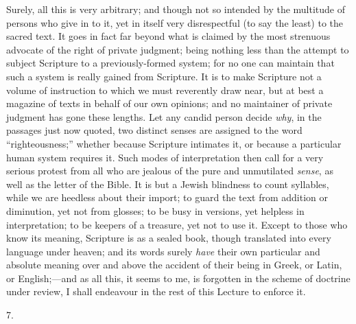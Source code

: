 Surely, all this is very arbitrary; and though not so intended by
the multitude of persons who give in to it, yet in itself very
disrespectful (to say the least) to the sacred text. It goes in fact
far beyond what is claimed by the most strenuous advocate of the right
of private judgment; being nothing less than the attempt to subject
Scripture to a previously-formed system; for no one can maintain that
such a system is really gained from Scripture. It is to make
Scripture not a volume of instruction to which we must reverently draw
near, but at best a magazine of texts in behalf of our own opinions;
and no maintainer of private judgment has gone these lengths. Let any
candid person decide \emph{why}, in the passages just now quoted, two
distinct senses are assigned to the word ``righteousness;''
whether because Scripture intimates it, or because a particular human
system requires it. Such modes of interpretation then call for a very
serious protest from all who are jealous of the pure and unmutilated \emph{sense},
as well as the letter of the Bible. It is but a Jewish blindness to
count syllables, while we are heedless about their import; to guard
the text from addition or diminution, yet not from glosses; to be busy
in versions, yet helpless in interpretation; to be keepers of a
treasure, yet not to use it. Except to those who know its meaning,
Scripture is as a sealed book, though translated into every language
under heaven; and its words surely \emph{have} their own particular
and absolute meaning over and above the accident of their being in
Greek, or Latin, or English;—and as all this, it seems to me, is
forgotten in the scheme of doctrine under review, I shall endeavour in
the rest of this Lecture to enforce it.

7.


